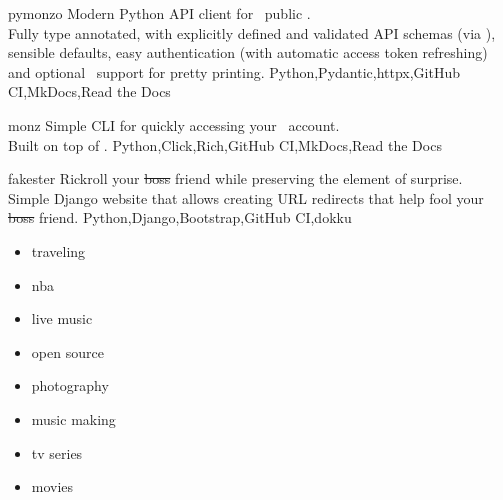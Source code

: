 \documentclass[localFont,alternative,10pt]{yaac-another-awesome-cv}
\begin{document}
  \vspace{0.5em}


  \begin{projects}
    \project
      {pymonzo}{}
      { }
      {
        Modern Python API client for ~public . \\
        Fully type annotated, with explicitly defined and validated API schemas (via ),
        sensible defaults, easy authentication (with automatic access token refreshing)
        and optional ~support for pretty printing.
      }
      {Python,Pydantic,httpx,GitHub CI,MkDocs,Read the Docs}

    \project
      {monz}{}
      { }
      {
        Simple CLI for quickly accessing your ~account. \\
        Built on top of .
      }
      {Python,Click,Rich,GitHub CI,MkDocs,Read the Docs}

    \project
      {fakester}{}
      { }
      {
        Rickroll your \sout{boss} friend while preserving the element of surprise. \\
        Simple Django website that allows creating URL redirects that help fool your \sout{boss} friend.
      }
      {Python,Django,Bootstrap,GitHub CI,dokku}
  \end{projects}

  \twocolumnsection
  {
    \begin{skills}
    \end{skills}}
  {
    \vspace{1em}
    \begin{multicols}{2}
      \begin{itemize}
        \item traveling
        \item nba
        \item live music
        \item open source
        \item photography
        \item music making
        \item tv series
        \item movies
      \end{itemize}
    \end{multicols}
  }
\end{document}
